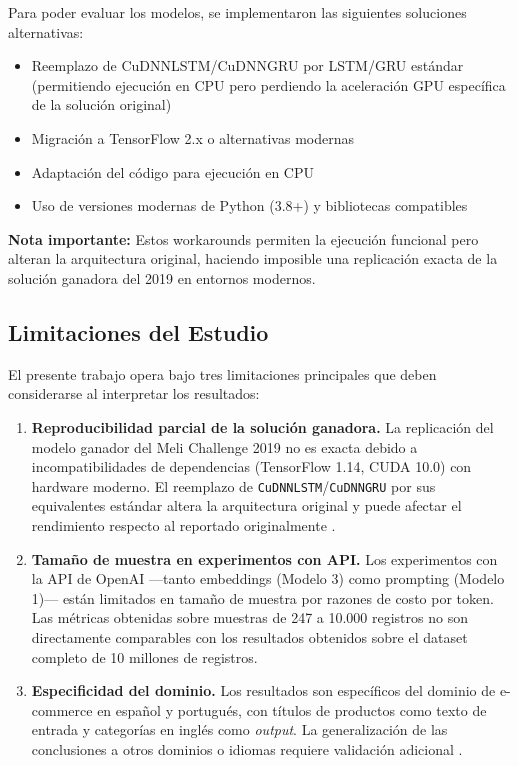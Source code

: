 \documentclass[11pt,a4paper]{article}
\begin{document}
Para poder evaluar los modelos, se implementaron las siguientes soluciones alternativas:

\begin{itemize}
    \item Reemplazo de CuDNNLSTM/CuDNNGRU por LSTM/GRU estándar (permitiendo ejecución en CPU pero perdiendo la aceleración GPU específica de la solución original)
    \item Migración a TensorFlow 2.x o alternativas modernas
    \item Adaptación del código para ejecución en CPU
    \item Uso de versiones modernas de Python (3.8+) y bibliotecas compatibles
\end{itemize}

\textbf{Nota importante:} Estos workarounds permiten la ejecución funcional pero alteran la arquitectura original, haciendo imposible una replicación exacta de la solución ganadora del 2019 en entornos modernos.

\subsection{Limitaciones del Estudio}

El presente trabajo opera bajo tres limitaciones principales que deben considerarse al interpretar los resultados:

\begin{enumerate}
    \item \textbf{Reproducibilidad parcial de la solución ganadora.} La replicación del modelo ganador del Meli Challenge 2019 no es exacta debido a incompatibilidades de dependencias (TensorFlow 1.14, CUDA 10.0) con hardware moderno. El reemplazo de \texttt{CuDNNLSTM}/\texttt{CuDNNGRU} por sus equivalentes estándar altera la arquitectura original y puede afectar el rendimiento respecto al reportado originalmente \cite{pineau2021}.
    \item \textbf{Tamaño de muestra en experimentos con API.} Los experimentos con la API de OpenAI ---tanto embeddings (Modelo 3) como prompting (Modelo 1)--- están limitados en tamaño de muestra por razones de costo por token. Las métricas obtenidas sobre muestras de 247 a 10.000 registros no son directamente comparables con los resultados obtenidos sobre el dataset completo de 10 millones de registros.
    \item \textbf{Especificidad del dominio.} Los resultados son específicos del dominio de e-commerce en español y portugués, con títulos de productos como texto de entrada y categorías en inglés como \textit{output}. La generalización de las conclusiones a otros dominios o idiomas requiere validación adicional \cite{kozareva2015}.
\end{enumerate}
\end{document}
